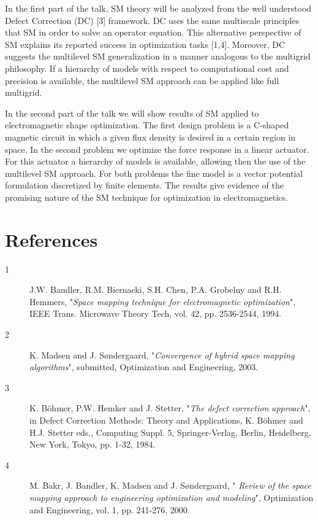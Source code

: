 \documentclass{report}
\begin{document}
In the first part of the talk, SM theory will be analyzed from the well understood
Defect Correction (DC) [3] framework. DC uses the same multiscale principles that SM
in order to solve an operator equation. This alternative perspective of SM explains
its reported success in optimization tasks [1,4]. Moreover, DC suggests the multilevel
SM generalization in a manner analogous to the multigrid philosophy. If a hierarchy
of models with respect to computational cost and precision is available, the multilevel
SM approach can be applied like full multigrid.

In the second part of the talk we will show results of SM applied to
electromagnetic shape
optimization. The first design problem is a C-shaped magnetic circuit in which a given
flux density is desired in a certain region in space. In the second
problem we optimize the
force response in a linear actuator. For this actuator a hierarchy of
models is available,
allowing then the use of the multilevel SM approach. For both problems the fine model
is a vector potential formulation discretized by finite elements. The results give
evidence of the promising nature of the SM technique for optimization in
electromagnetics.

\section*{References}
\begin{description}

\item[1] J.W. Bandler, R.M. Biernacki, S.H. Chen, P.A. Grobelny and R.H. Hemmers,
"{\it Space mapping technique for electromagnetic optimization}", IEEE Trans. Microwave
Theory Tech, vol. 42, pp. 2536-2544, 1994.

\item[2] K. Madsen and J. S\o ndergaard, "{\it Convergence of hybrid
space mapping algorithms}",
submitted, Optimization and Engineering, 2003.

\item[3] K. B\"{o}hmer, P.W. Hemker and J. Stetter, "{\it The defect
correction approach}", in Defect
Correction Methods: Theory and Applications, K. B\"{o}hmer and H.J.
Stetter eds., Computing Suppl. 5,
Springer-Verlag, Berlin, Heidelberg, New York, Tokyo, pp. 1-32, 1984.

\item[4] M. Bakr, J. Bandler, K. Madsen and J. S\o ndergaard, "{\it
Review of the space mapping
approach to engineering optimization and modeling}", Optimization and
Engineering, vol. 1,
pp. 241-276, 2000.

\end{description}
\end{document}
